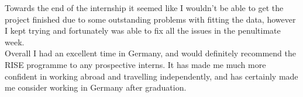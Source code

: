 \documentclass[final,a4paper,oneside,12pt]{article}
\begin{document}
Towards the end of the internship it seemed like I wouldn't be able to get the project finished due to some outstanding problems with fitting the data, however I kept trying and fortunately was able to fix all the issues in the penultimate week.\\

Overall I had an excellent time in Germany, and would definitely recommend the RISE programme to any prospective interns. It has made me much more confident in working abroad and travelling independently, and has certainly made me consider working in Germany after graduation.
\end{document}

